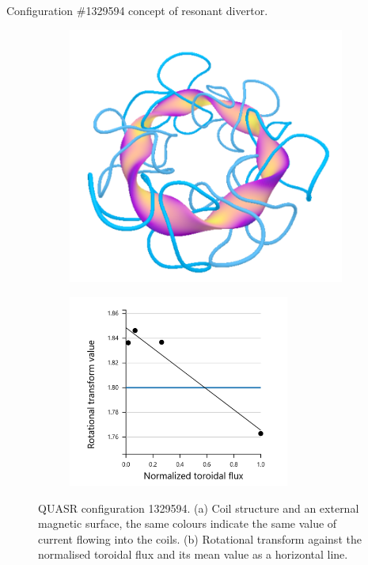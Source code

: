 Configuration \#1329594 concept of resonant divertor.

\begin{figure}[H]
    \centering
    \begin{subfigure}[t]{0.49\textwidth}
        \centering
        \includegraphics[width=\textwidth]{images/quasrs/config-1329594.png}
        \caption{}
        \label{fig:coils-1329594}
    \end{subfigure}
    \hfill
    \begin{subfigure}[t]{0.49\textwidth}
        \centering
        \includegraphics[width=0.8\textwidth]{images/quasrs/iota-1329594.png}
        \caption{}
        \label{fig:iota-1329594}
    \end{subfigure}
    \caption{QUASR configuration 1329594. (a) Coil structure and an external magnetic surface, the same colours indicate the same value of current flowing into the coils. (b) Rotational transform against the normalised toroidal flux and its mean value as a horizontal line.}
    \label{fig:config-1329594}
\end{figure}

